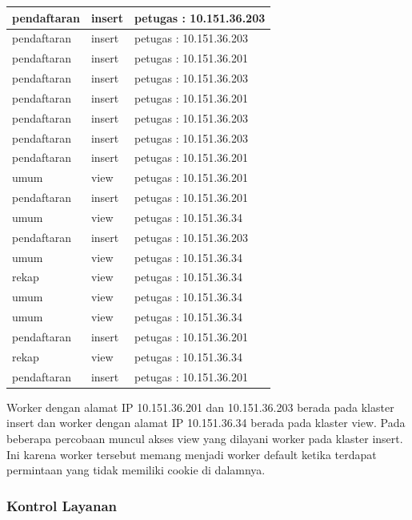 \documentclass{ta-its}
\begin{document}
\begin{longtable}{|p{}|p{}|p{}|}
						pendaftaran & insert & petugas :  10.151.36.203 \\ \hline
						pendaftaran & insert & petugas :  10.151.36.203 \\ \hline
						pendaftaran & insert & petugas :  10.151.36.201 \\ \hline
						pendaftaran & insert & petugas :  10.151.36.203 \\ \hline
						pendaftaran & insert & petugas :  10.151.36.201 \\ \hline
						pendaftaran	& insert & petugas :  10.151.36.203 \\ \hline
						pendaftaran	& insert & petugas :  10.151.36.203 \\ \hline
						pendaftaran	& insert & petugas :  10.151.36.201 \\ \hline
						umum & view & petugas :  10.151.36.201 \\ \hline
						pendaftaran & insert & petugas :  10.151.36.201 \\ \hline
						umum & view & petugas :  10.151.36.34 \\ \hline
						pendaftaran & insert & petugas :  10.151.36.203 \\ \hline
						umum & view & petugas :  10.151.36.34 \\ \hline
						rekap & view & petugas :  10.151.36.34 \\ \hline
						umum & view & petugas :  10.151.36.34 \\ \hline
						umum & view & petugas :  10.151.36.34 \\ \hline
						pendaftaran & insert & petugas :  10.151.36.201 \\ \hline
						rekap & view & petugas :  10.151.36.34 \\ \hline
						pendaftaran & insert & petugas :  10.151.36.201 \\ \hline
						
						
					\end{longtable}
					
					Worker dengan alamat IP 10.151.36.201 dan 10.151.36.203 berada pada klaster insert dan worker dengan alamat IP 10.151.36.34 berada pada klaster view. Pada beberapa percobaan muncul akses view yang dilayani worker pada klaster insert. Ini karena worker tersebut memang menjadi worker default ketika terdapat permintaan yang tidak memiliki cookie di dalamnya.
				
				\subsubsection{Kontrol Layanan}
				
\end{document}

